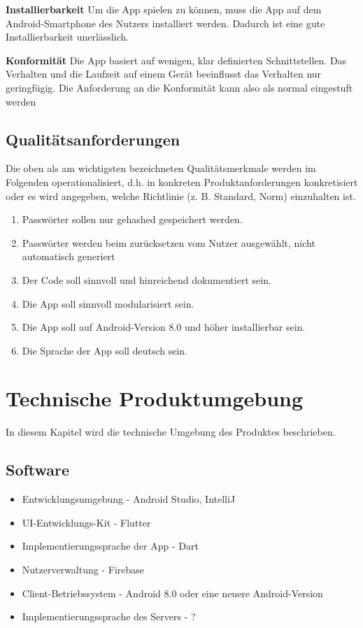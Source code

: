 \documentclass[parskip=full]{scrartcl}
\begin{document}
\textbf{Installierbarkeit}\newline
Um die App spielen zu können, muss die App auf dem Android-Smartphone des Nutzers installiert werden.
Dadurch ist eine gute Installierbarkeit unerlässlich.

\textbf{Konformität}\newline
Die App basiert auf wenigen, klar definierten Schnittstellen. Das Verhalten und die Laufzeit auf einem Gerät beeinflusst das Verhalten nur geringfügig. Die Anforderung an die Konformität kann also als normal eingestuft werden

\subsection{Qualitätsanforderungen}
Die oben als am wichtigsten bezeichneten Qualitätsmerkmale werden im Folgenden operationalisiert, d.h. in konkreten Produktanforderungen konkretisiert oder es wird angegeben, welche Richtlinie (z. B. Standard, Norm) einzuhalten ist.

\begin{enumerate}[start=1,label={$\langle$\bfseries Q\arabic*$\rangle$}, leftmargin = 5em, itemsep=4pt, parsep=4pt]
    \item Passwörter sollen nur gehashed gespeichert werden.
    \item Passwörter werden beim zurücksetzen vom Nutzer ausgewählt, nicht automatisch generiert
    \item Der Code soll sinnvoll und hinreichend dokumentiert sein.
    \item Die App soll sinnvoll modularisiert sein.
    \item Die App soll auf Android-Version 8.0 und höher installierbar sein.
    \item Die Sprache der App soll deutsch sein.
\end{enumerate}

\section{Technische Produktumgebung}
In diesem Kapitel wird die technische Umgebung des Produktes beschrieben.

\subsection{Software}
\begin{itemize}
    \item Entwicklungsumgebung - Android Studio, IntelliJ
    \item UI-Entwicklungs-Kit - Flutter
    \item Implementierungssprache der App - Dart
    \item Nutzerverwaltung - Firebase
    \item Client-Betriebssystem - Android 8.0 oder eine neuere Android-Version
    \item Implementierungssprache des Servers - ?
\end{itemize}
\end{document}
